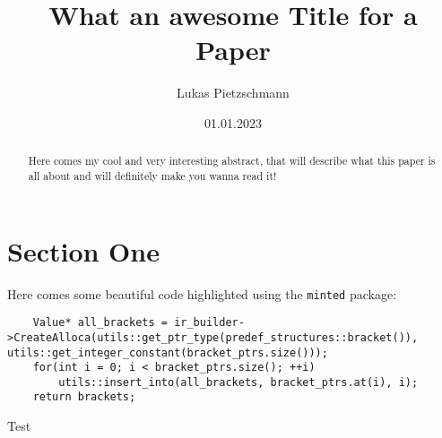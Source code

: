 \documentclass[german, sidenote]{article}
\title{What an awesome Title for a Paper}
\author{Lukas Pietzschmann}
\date{01.01.2023}
\begin{document}
\maketitle

\begin{abstract}
Here comes my cool and very interesting abstract, that will describe what this paper is all about
and will definitely make you wanna read it!
\end{abstract}

\tableofcontents

\emptypage

\section{Section One}

\par
Here comes some beautiful code highlighted using the \texttt{minted} package:
\begin{listing}[H]
\begin{verbatim}
	Value* all_brackets = ir_builder->CreateAlloca(utils::get_ptr_type(predef_structures::bracket()), utils::get_integer_constant(bracket_ptrs.size()));
	for(int i = 0; i < bracket_ptrs.size(); ++i)
		utils::insert_into(all_brackets, bracket_ptrs.at(i), i);
	return brackets;
\end{verbatim}
\caption{Test}
\end{listing}

\begin{appendix}
\listoflistings
\end{appendix}
\end{document}
